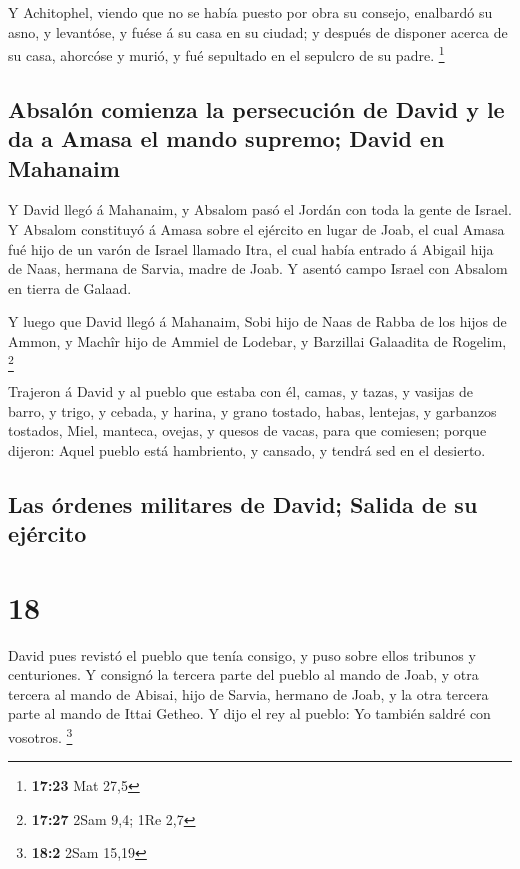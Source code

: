  Y Achitophel, viendo que no se había puesto por obra su
consejo, enalbardó su asno, y levantóse, y fuése á su casa en su ciudad;
y después de disponer acerca de su casa, ahorcóse y murió, y fué
sepultado en el sepulcro de su padre. \footnote{\textbf{17:23} Mat 27,5}

\hypertarget{absaluxf3n-comienza-la-persecuciuxf3n-de-david-y-le-da-a-amasa-el-mando-supremo-david-en-mahanaim}{%
\subsection{Absalón comienza la persecución de David y le da a Amasa el
mando supremo; David en
Mahanaim}\label{absaluxf3n-comienza-la-persecuciuxf3n-de-david-y-le-da-a-amasa-el-mando-supremo-david-en-mahanaim}}

 Y David llegó á Mahanaim, y Absalom pasó el Jordán con
toda la gente de Israel.  Y Absalom constituyó á Amasa
sobre el ejército en lugar de Joab, el cual Amasa fué hijo de un varón
de Israel llamado Itra, el cual había entrado á Abigail hija de Naas,
hermana de Sarvia, madre de Joab.  Y asentó campo Israel
con Absalom en tierra de Galaad.

 Y luego que David llegó á Mahanaim, Sobi hijo de Naas de
Rabba de los hijos de Ammon, y Machîr hijo de Ammiel de Lodebar, y
Barzillai Galaadita de Rogelim, \footnote{\textbf{17:27} 2Sam 9,4; 1Re
  2,7}

 Trajeron á David y al pueblo que estaba con él, camas, y
tazas, y vasijas de barro, y trigo, y cebada, y harina, y grano tostado,
habas, lentejas, y garbanzos tostados,  Miel, manteca,
ovejas, y quesos de vacas, para que comiesen; porque dijeron: Aquel
pueblo está hambriento, y cansado, y tendrá sed en el desierto.

\hypertarget{las-uxf3rdenes-militares-de-david-salida-de-su-ejuxe9rcito}{%
\subsection{Las órdenes militares de David; Salida de su
ejército}\label{las-uxf3rdenes-militares-de-david-salida-de-su-ejuxe9rcito}}

\hypertarget{section-17}{%
\section{18}\label{section-17}}

 David pues revistó el pueblo que tenía consigo, y puso
sobre ellos tribunos y centuriones.  Y consignó la tercera
parte del pueblo al mando de Joab, y otra tercera al mando de Abisai,
hijo de Sarvia, hermano de Joab, y la otra tercera parte al mando de
Ittai Getheo. Y dijo el rey al pueblo: Yo también saldré con vosotros.
\footnote{\textbf{18:2} 2Sam 15,19}

